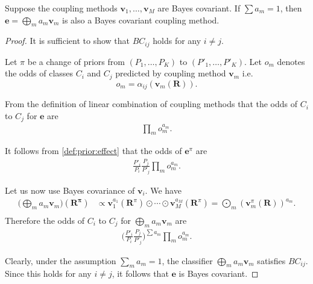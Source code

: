 \begin{prop}
	\label{prop:ensemble}
Suppose the coupling methods $\boldsymbol{v}_1, \ldots, \boldsymbol{v}_M$ are Bayes covariant. If $\sum a_m = 1$, then $\boldsymbol{e} = \bigoplus_m a_m \boldsymbol{v}_m$ is also a Bayes covariant coupling method.
\end{prop}

\begin{proof}
It is sufficient to show that $BC_{ij}$ holds for any $i\not= j$. 

Let $\pi$ be a change of priors from $(P_1, \ldots, P_K)$  to $(P'_1, \ldots, P'_K)$. Let $o_m$ denotes the odds of classes $C_i$ and $C_j$ predicted by coupling method $\boldsymbol{v}_m$ i.e.
$$
o_m = \alpha_{ij}(\boldsymbol{v}_m(\boldsymbol{R})).
$$

From the definition of linear combination of coupling methods that the odds of $C_i$ to $C_j$ for $\boldsymbol{e}$ are
\begin{align}
\prod_m o_m^{a_m}.
\end{align}

It follows from \eqref{def:prior:effect} that the odds of $\boldsymbol{e}^\pi$ are 
\begin{align}
\frac{P'_i}{P_i} \frac{P_j}{P'_j} \prod_m o_m^{a_m}.
\end{align}

Let us now use Bayes covariance of $\boldsymbol{v}_i$. 
We have
\begin{align}
	\biggl(\bigoplus_m a_m \boldsymbol{v}_m\biggr)(\boldsymbol{R^\pi}) & \propto 
	\boldsymbol{v}_1^{a_1}(\boldsymbol{R}^\pi) \odot \cdots \odot \boldsymbol{v}_M^{a_M}(\boldsymbol{R}^\pi) =  \bigodot_m  (\boldsymbol{v}_m^\pi(\boldsymbol{R}))^{a_m}. \\
\end{align}
Therefore the odds of $C_i$ to $C_j$ for $\bigoplus_m a_m \boldsymbol{v}_m$ are 
\begin{align}
\biggl(\frac{P'_i}{P_i} \frac{P_j}{P'_j} \biggr)^{\sum a_m} \prod_m o_m^{a_m}.
\end{align}

Clearly, under the assumption $\sum_m a_m = 1$, the classifier $\bigoplus_m a_m \boldsymbol{v}_m$ satisfies $BC_{ij}$. Since this holds for any $i\not=j$,  it follows that $\boldsymbol{e}$ is Bayes covariant.
\end{proof}


% 

